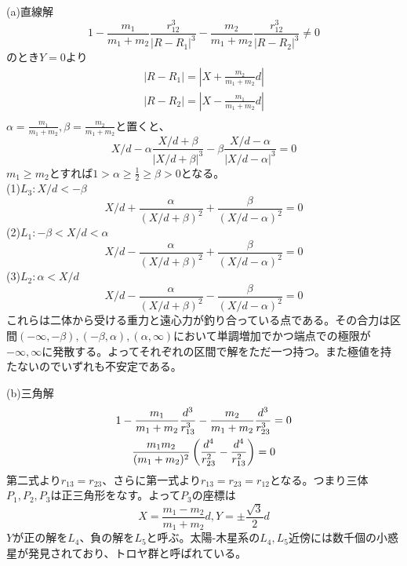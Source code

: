 		(a)直線解
			\[1 - \frac{m_1}{m_1 + m_2}\frac{r_{12}^3}{|R - R_1|^3} - \frac{m_2}{m_1 + m_2}\frac{r_{12}^3}{|R - R_2|^3} \neq 0\]
		のとき$Y = 0$より
		\begin{gather*}
			|R - R_1| = |X + \frac{m_2}{m_1 + m_2}d|\\
			|R - R_2| = |X - \frac{m_1}{m_1 + m_2}d|\\
		\end{gather*}
		$\alpha = \frac{m_1}{m_1 + m_2}, \beta = \frac{m_2}{m_1 + m_2}$と置くと、
			\[X/d - \alpha\frac{X/d + \beta}{|X/d + \beta|^3} - \beta\frac{X/d - \alpha}{|X/d - \alpha|^3} = 0\]
		$m_1 \geq m_2$とすれば$1 > \alpha \geq \frac{1}{2} \geq \beta > 0$となる。\\
		(1)$L_3:X/d < -\beta$
			\[X/d + \frac{\alpha}{(X/d + \beta)^2} + \frac{\beta}{(X/d - \alpha)^2} = 0\]
		(2)$L_1:-\beta < X/d < \alpha$
			\[X/d - \frac{\alpha}{(X/d + \beta)^2} + \frac{\beta}{(X/d - \alpha)^2} = 0\]
		(3)$L_2:\alpha < X/d$
			\[X/d - \frac{\alpha}{(X/d + \beta)^2} - \frac{\beta}{(X/d - \alpha)^2} = 0\]
		これらは二体から受ける重力と遠心力が釣り合っている点である。その合力は区間$(-\infty,-\beta), (-\beta,\alpha), (\alpha,\infty)$において単調増加でかつ端点での極限が$-\infty,\infty$に発散する。よってそれぞれの区間で解をただ一つ持つ。また極値を持たないのでいずれも不安定である。

		(b)三角解
		\begin{gather*}
			1 - \frac{m_1}{m_1 + m_2}\frac{d^3}{r_{13}^3} - \frac{m_2}{m_1 + m_2}\frac{d^3}{r_{23}^3} = 0\\
			\frac{m_1m_2}{(m_1 + m_2)^2}\left( \frac{d^4}{r_{23}^2} - \frac{d^4}{r_{13}^2}  \right) = 0\\
		\end{gather*}
		第二式より$r_{13} = r_{23}$、さらに第一式より$r_{13} = r_{23} = r_{12}$となる。つまり三体$P_1,P_2,P_3$は正三角形をなす。よって$P_3$の座標は
			\[X = \frac{m_1 - m_2}{m_1 + m_2}d, Y = \pm \frac{\sqrt{3}}{2}d\]
		$Y$が正の解を$L_4$、負の解を$L_5$と呼ぶ。太陽-木星系の$L_4,L_5$近傍には数千個の小惑星が発見されており、トロヤ群と呼ばれている。
	
